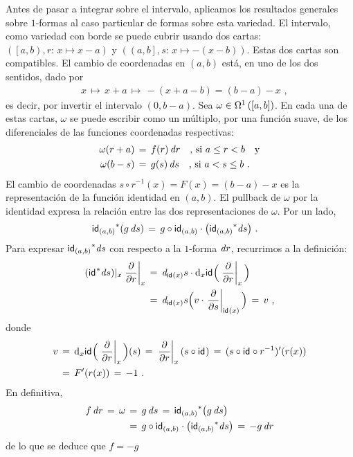 Antes de pasar a integrar sobre el intervalo, aplicamos los resultados
generales sobre $1$-formas al caso particular de formas sobre esta
variedad. El intervalo, como variedad con borde se puede cubrir usando
dos cartas: $(\left[a,b\right),r:\,x\mapsto x-a)$ y
$(\left(a,b\right],s:\,x\mapsto -(x-b))$. Estas dos cartas son compatibles.
El cambio de coordenadas en $(a,b)$ est\'{a}, en uno de los dos sentidos,
dado por
\begin{align*}
	& x\,\mapsto\, x+a\,\mapsto\,-(x+a-b)= (b-a) - x
	\text{ ,}
\end{align*}
%
es decir, por invertir el intervalo $(0,b-a)$. Sea
$\omega\in\formes[1]{[a,b]}$. En cada una de estas cartas, $\omega$ se puede
escribir como un m\'{u}ltiplo, por una funci\'{o}n suave, de los
diferenciales de las funciones coordenadas respectivas:
\begin{align*}
	\omega(r+a) & \,=\, f(r)\,\derext{r}\quad\text{, si }a\leq r<b
	\quad\text{y} \\
	\omega(b-s) & \,=\,g(s)\,\derext{s}\quad\text{, si }a<s\leq b
	\text{ .}
\end{align*}
%
El cambio de coordenadas $s\circ r^{-1}(x)=F(x)=(b-a)-x$ es la
representaci\'{o}n de la funci\'{o}n identidad en $(a,b)$. El pullback
de $\omega$ por la identidad expresa la relaci\'{o}n entre las dos
representaciones de $\omega$. Por un lado,
\begin{align*}
	\pull{\id[(a,b)]}(g\,\derext{s}) & \,=\,
		g\circ\id[(a,b)]\cdot\big(\pull{\id[(a,b)]}\derext{s}\big)
	\text{ .}
\end{align*}
%
Para expresar $\pull{\id[(a,b)]}\derext{s}$ con respecto a la
$1$-forma $\derext{r}$, recurrimos a la definici\'{o}n:
\begin{align*}
	(\pull{\id}\derext{s})|_{x}\gancho[x]{r} & \,=\,
		\derext[\id(x)]{s}\cdot
		\diferencial[x]{\id}\Big(\gancho[x]{r}\Big)\\
	& \,=\,\derext[\id(x)]{s}\Big(v\cdot\gancho[\id(x)]{s}\Big) \,=\,v
	\text{ ,}
\end{align*}
%
donde
\begin{align*}
	v & \,=\,\diferencial[x]{\id}\Big(\gancho[x]{r}\Big)(s) \,=\,
		\gancho[x]{r}(s\circ\id)\,=\,(s\circ\id\circ r^{-1})'(r(x)) \\
	& \,=\,F'(r(x)) \,=\,-1
	\text{ .}
\end{align*}
%
En definitiva,
\begin{align*}
	f\,\derext{r} \,=\,\omega & \,=\,g\,\derext{s} \,=\,
		\pull{\id[(a,b)]} \big(g\,\derext{s}\big) \\
	& \,=\,	g\circ\id[(a,b)]\cdot\big(\pull{\id[(a,b)]}\derext{s}\big)
		\,=\,-g\,\derext{r}
\end{align*}
%
de lo que se deduce que $f=-g$ 

